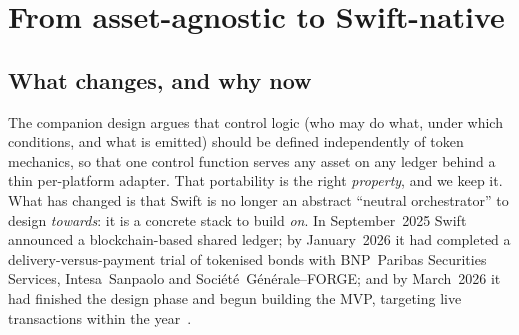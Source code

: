\documentclass[11pt,a4paper]{article}
\newcommand{\Iref}[1]{\textbf{I#1}}
\begin{document}
\begin{abstract}
primitive remains a signed \emph{wallet-to-BIC} binding, now given an explicit
\textbf{revocation lifecycle}: a sticky, governed binding revocation that a
re-screen cannot undo (invariant \Iref{9}). Three further refinements close the
gaps a protocol review would flag: that binding revocation; \textbf{operator
sequencing accountability}, argued from Besu's QBFT validator set rather than
assumed; and an explicit \textbf{transaction-graph confidentiality} posture for a
permissioned ledger. We close with a progressive trust-minimisation roadmap and
are explicit about what Swift's estate does \emph{not} give us --- investor-level
KYC, a productised signer, custody --- so the proposal is buildable rather than
aspirational.
\end{abstract}

\newpage
\tableofcontents
\vspace{0.5cm}
\newpage

\section{From asset-agnostic to Swift-native}
\label{sec:intro}

\subsection{What changes, and why now}
The companion design argues that control logic (who may do what, under which
conditions, and what is emitted) should be defined independently of token
mechanics, so that one control function serves any asset on any ledger behind a
thin per-platform adapter. That portability is the right \emph{property}, and we
keep it. What has changed is that Swift is no longer an abstract ``neutral
orchestrator'' to design \emph{towards}: it is a concrete stack to build
\emph{on}. In September~2025 Swift announced a blockchain-based shared ledger; by
January~2026 it had completed a delivery-versus-payment trial of tokenised bonds
with BNP~Paribas Securities Services, Intesa~Sanpaolo and
Soci\'et\'e~G\'en\'erale--FORGE; and by March~2026 it had finished the design
phase and begun building the MVP, targeting live transactions within the
year~\cite{swiftledgerpr,swiftmvp,fstrial}.
\end{document}
